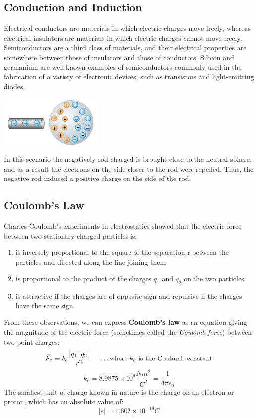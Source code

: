 \documentclass{article}
\begin{document}
	\subsection{Conduction and Induction}
    	Electrical conductors are materials in which electric charges move freely, whereas electrical insulators are materials in which electric charges cannot move freely. Semiconductors are a third class of materials, and their electrical properties are somewhere between those of insulators and those of conductors. Silicon and germanium are well-known examples of semiconductors commonly used in the fabrication of a variety of electronic devices, such as transistors and light-emitting diodes.
        \begin{multicols}{2}
        	\centerline{\includegraphics[width=5cm]{charges.png}}
		\columnbreak
        	In this scenario the negatively rod charged is brought close to the neutral sphere, and as a result the electrons on the side closer to the rod were repelled. Thus, the negative rod induced a positive charge on the side of the rod.
        \end{multicols}

	\subsection{Coulomb's Law}
    	Charles Coulomb’s experiments in electrostatics showed that the electric force between two stationary charged particles is:\\
        \begin{enumerate}
        	\item is inversely proportional to the square of the separation r between the particles and directed along the line joining them
            \item is proportional to the product of the charges $q_1$ and $q_2$ on the two particles
            \item is attractive if the charges are of opposite sign and repulsive if the charges have the same sign\\
		\end{enumerate}
        From these observations, we can express \textbf{Coulomb’s law} as an equation giving the magnitude of the electric force (sometimes called the \textit{Coulomb force}) between two point charges:
        \[
        	\vec{F}_e=k_e\frac{\lvert q_1\rvert\lvert q_2\rvert}{r^2} \indent
            \text{\ldots where $k_e$ is the Coulomb constant}
        \]
        \[
        	k_e=8.9875\times 10^9 \frac{Nm^2}{C^2}=\frac{1}{4\pi\epsilon_0}
        \]
        The smallest unit of charge known in nature is the charge on an electron or proton, which has an absolute value of:
        \[
        	\lvert e \rvert = 1.602\times 10^{-19} C
        \]
\end{document}
